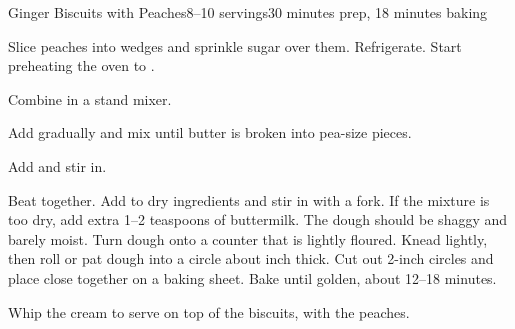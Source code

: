 \documentclass[../Cookbook.tex]{subfiles}
\begin{document}
\begin{recipe}{Ginger Biscuits with Peaches}{8--10 servings}{30 minutes prep, 18 minutes baking}

Slice peaches into wedges and sprinkle sugar over them. Refrigerate.
Start preheating the oven to .

Combine in a stand mixer.

Add gradually and mix until butter is broken into pea-size pieces.

Add and stir in.

Beat together. Add to dry ingredients and stir in with a fork. If the mixture is too dry, add extra 1--2 teaspoons of buttermilk. The dough should be shaggy and barely moist.
Turn dough onto a counter that is lightly floured. Knead lightly, then roll or pat dough into a circle about  inch thick. Cut out 2-inch circles and place close together on a baking sheet. Bake until golden, about 12--18 minutes.

Whip the cream to serve on top of the biscuits, with the peaches.

\end{recipe}
\end{document}
